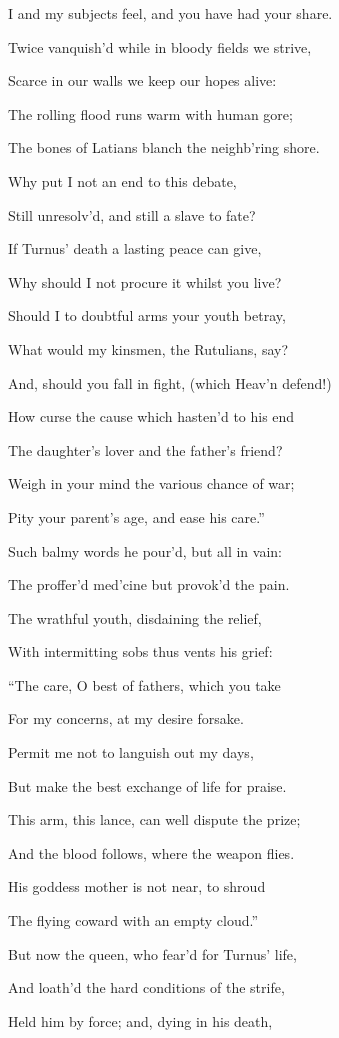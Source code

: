 I and my subjects feel, and you have had your share.

Twice vanquish’d while in bloody fields we strive,

Scarce in our walls we keep our hopes alive:

The rolling flood runs warm with human gore;

The bones of Latians blanch the neighb’ring shore.

Why put I not an end to this debate,

Still unresolv’d, and still a slave to fate?

If Turnus’ death a lasting peace can give,

Why should I not procure it whilst you live?

Should I to doubtful arms your youth betray,

What would my kinsmen, the Rutulians, say?

And, should you fall in fight, (which Heav’n defend!)

How curse the cause which hasten’d to his end

The daughter’s lover and the father’s friend?

Weigh in your mind the various chance of war;

Pity your parent’s age, and ease his care.”

Such balmy words he pour’d, but all in vain:

The proffer’d med’cine but provok’d the pain.

The wrathful youth, disdaining the relief,

With intermitting sobs thus vents his grief:

“The care, O best of fathers, which you take

For my concerns, at my desire forsake.

Permit me not to languish out my days,

But make the best exchange of life for praise.

This arm, this lance, can well dispute the prize;

And the blood follows, where the weapon flies.

His goddess mother is not near, to shroud

The flying coward with an empty cloud.”

But now the queen, who fear’d for Turnus’ life,

And loath’d the hard conditions of the strife,

Held him by force; and, dying in his death,

